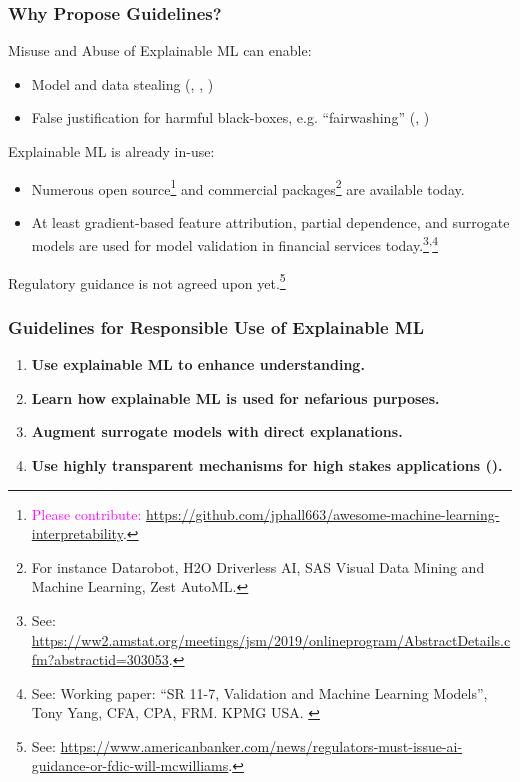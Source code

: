 \documentclass[11pt,aspectratio=169,hyperref={colorlinks}]{beamer}
\begin{document}
	\begin{frame}[t]
	
		\frametitle{Why Propose Guidelines?}		

		Misuse and Abuse of Explainable ML can enable:
		\begin{itemize}\footnotesize
			\item Model and data stealing (\citet{model_stealing}, \citet{membership_inference}, \citet{shokri2019privacy})
			\item False justification for harmful black-boxes, e.g. ``fairwashing'' (\citet{fair_washing}, \citet{please_stop})
		\end{itemize}
		\vspace{5pt}		
		Explainable ML is already in-use: 
		\begin{itemize}\footnotesize
		\item Numerous open source\footnote{\tiny{\textcolor{magenta}{Please contribute:} \url{https://github.com/jphall663/awesome-machine-learning-interpretability}.}} and commercial packages\footnote{\tiny{For instance Datarobot, H2O Driverless AI, SAS Visual Data Mining and Machine Learning, Zest AutoML.}} are available today.
		\item At least gradient-based feature attribution, partial dependence, and surrogate models are used for model validation in financial services today.\footnote{\tiny{See: \url{https://ww2.amstat.org/meetings/jsm/2019/onlineprogram/AbstractDetails.cfm?abstractid=303053}.}}\textsuperscript{,}\footnote{\tiny{See: Working paper: ``SR 11-7, Validation and Machine Learning Models'', Tony Yang, CFA, CPA, FRM. KPMG USA. \label{fn:yang}}} 
		\end{itemize}
		\vspace{5pt}	
		Regulatory guidance is not agreed upon yet.\footnote{\tiny{See: \url{https://www.americanbanker.com/news/regulators-must-issue-ai-guidance-or-fdic-will-mcwilliams}.}}
		\normalsize	
		
	\end{frame}

	\begin{frame}
	
		\frametitle{Guidelines for Responsible Use of Explainable ML}
		
		\begin{enumerate}\Large
			\item \textbf{Use explainable ML to enhance understanding.}
			\item \textbf{Learn how explainable ML is used for nefarious purposes.}
			\item \textbf{Augment surrogate models with direct explanations.}
			\item \textbf{Use highly transparent mechanisms for high stakes applications (\citet{please_stop}).}
		\end{enumerate}
		
	\end{frame}
\end{document}
